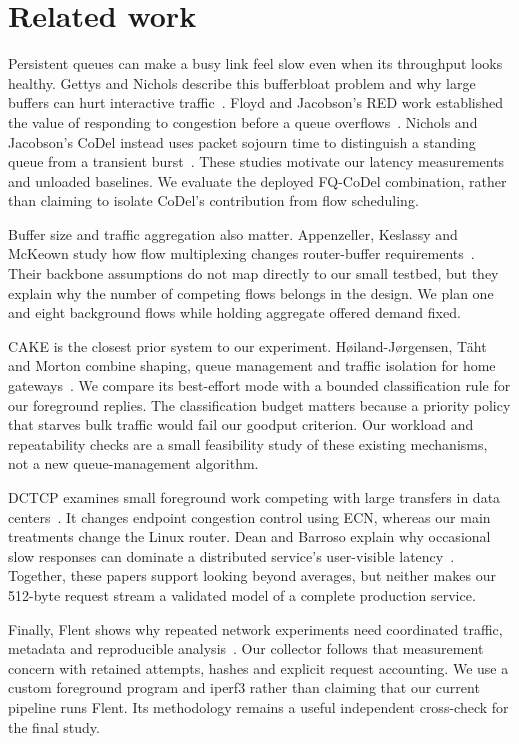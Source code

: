 \section{Related work}
Persistent queues can make a busy link feel slow even when its throughput
looks healthy. Gettys and Nichols describe this bufferbloat problem and why
large buffers can hurt interactive traffic~\cite{bufferbloat}. Floyd and
Jacobson's RED work established the value of responding to congestion before
a queue overflows~\cite{red}. Nichols and Jacobson's CoDel instead uses packet
sojourn time to distinguish a standing queue from a transient burst~\cite{codel}.
These studies motivate our latency measurements and unloaded baselines.
We evaluate the deployed FQ-CoDel combination, rather than claiming to isolate
CoDel's contribution from flow scheduling.

Buffer size and traffic aggregation also matter. Appenzeller, Keslassy and
McKeown study how flow multiplexing changes router-buffer requirements~\cite{buffers}.
Their backbone assumptions do not map directly to our small testbed, but they
explain why the number of competing flows belongs in the design. We plan one
and eight background flows while holding aggregate offered demand fixed.

CAKE is the closest prior system to our experiment. H{\o}iland-J{\o}rgensen,
T{\"a}ht and Morton combine shaping, queue management and traffic isolation
for home gateways~\cite{cake}. We compare its best-effort mode with a bounded
classification rule for our foreground replies. The classification budget
matters because a priority policy that starves bulk traffic would fail our
goodput criterion. Our workload and repeatability checks are a small feasibility
study of these existing mechanisms, not a new queue-management algorithm.

DCTCP examines small foreground work competing with large transfers in data
centers~\cite{dctcp}. It changes endpoint congestion control using ECN, whereas
our main treatments change the Linux router. Dean and Barroso explain why
occasional slow responses can dominate a distributed service's user-visible
latency~\cite{tail}. Together, these papers support looking beyond averages,
but neither makes our 512-byte request stream a validated model of a complete
production service.

Finally, Flent shows why repeated network experiments need coordinated traffic,
metadata and reproducible analysis~\cite{flent}. Our collector follows that
measurement concern with retained attempts, hashes and explicit request
accounting. We use a custom foreground program and iperf3 rather than claiming
that our current pipeline runs Flent. Its methodology remains a useful
independent cross-check for the final study.
